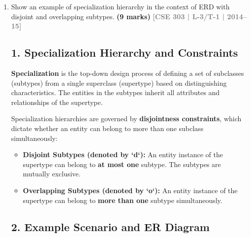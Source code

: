 \documentclass[12pt,a3paper]{article}
\newcommand{\yr}[1]{\hfill\textcolor{gray}{\small\textbf{[#1]}}}
\newcommand{\mk}[1]{\textcolor{orange!70!black}{\small\textbf{(#1 marks)}}}
\begin{document}
\begin{enumerate}
\begin{tcolorbox}[enhanced,breakable,ansbox,colback=cA!4,colframe=cA,boxrule=0.8pt,arc=5pt,title={\textbf{Answer}},fonttitle=\bfseries\color{white},colbacktitle=cA]
\hrule
\vspace{0.75em}
\noindent\textbf{Exam Tip (Relational Mapping):} When mapping this ER model to a relational database schema, you do not create a separate table for the identifying relationship. Instead, the resulting \texttt{DEPENDENT} table will simply have the composite primary key \texttt{(Emp\_ID, Dep\_Name)}, where \texttt{Emp\_ID} acts as a foreign key referencing the \texttt{EMPLOYEE} table.

\end{tcolorbox}





\item Show an example of specialization hierarchy in the context of ERD with disjoint and overlapping subtypes.
\mk{9} \yr{CSE 303 | L-3/T-1 | 2014--15}

\begin{tcolorbox}[enhanced,breakable,ansbox,colback=cA!4,colframe=cA,boxrule=0.8pt,arc=5pt,title={\textbf{Answer}},fonttitle=\bfseries\color{white},colbacktitle=cA]

\subsection*{1. Specialization Hierarchy and Constraints}

\textbf{Specialization} is the top-down design process of defining a set of subclasses (subtypes) from a single superclass (supertype) based on distinguishing characteristics. The entities in the subtypes inherit all attributes and relationships of the supertype. 

Specialization hierarchies are governed by \textbf{disjointness constraints}, which dictate whether an entity can belong to more than one subclass simultaneously:

\begin{itemize}
    \item \textbf{Disjoint Subtypes (denoted by `d`):} An entity instance of the supertype can belong to \textbf{at most one} subtype. The subtypes are mutually exclusive.
    \item \textbf{Overlapping Subtypes (denoted by `o`):} An entity instance of the supertype can belong to \textbf{more than one} subtype simultaneously.
\end{itemize}

\subsection*{2. Example Scenario and ER Diagram}


\end{tcolorbox}
\end{enumerate}
\end{document}
